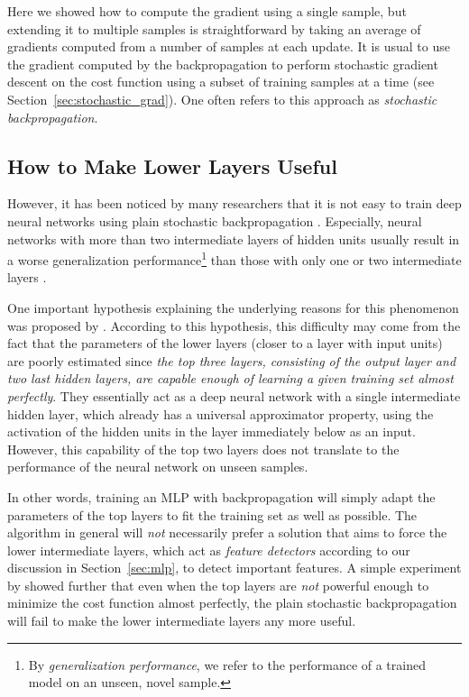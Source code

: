 \documentclass[dissertation,nocontribution,draft*]{aaltoseries}
\begin{document}
Here we showed how to compute the gradient using a single
sample, but extending it to multiple samples is
straightforward by taking an average of
gradients computed from a number of samples at each update. It is usual to
use the gradient computed by the backpropagation to perform
stochastic gradient descent on the cost function using a
subset of training samples at a time (see
Section~\ref{sec:stochastic_grad}). One often refers to this
approach as \textit{stochastic backpropagation}.

\subsection{How to Make Lower Layers Useful}
\label{sec:bp_imp}

However, it has been noticed by many researchers that it is not easy to
train deep neural networks using plain stochastic
backpropagation \citep[see, e.g.,][]{Bengio2007a}.
Especially, neural networks with more than two intermediate
layers of hidden units usually result in a worse
generalization performance\footnote{By
\textit{generalization performance}, we refer to the
performance of a trained model on an unseen, novel sample.
} than those with only one or two intermediate layers
\citep{Bengio2007nips}.

One important hypothesis explaining the underlying
reasons for this phenomenon was proposed by
\citet{Bengio2007nips}. According to this hypothesis, this
difficulty may come from the fact that the parameters of the
lower layers (closer to a layer with input units) are poorly
estimated since \textit{the top three layers, consisting of
the output layer and two last hidden layers, are capable
enough of learning a given training set almost perfectly}.
They essentially act as a deep neural network with a single
intermediate hidden layer, which already has a universal
approximator property, using the activation of the hidden
units in the layer immediately below as an input. However,
this capability of the top two layers does not translate to
the performance of the neural network on unseen samples.

In other words, training an MLP with backpropagation will
simply adapt the parameters of the top layers to fit the
training set as well as possible. The algorithm in general
will \textit{not} necessarily prefer a solution that aims to
force the lower intermediate layers, which act as
\textit{feature detectors} according to our discussion in
Section~\ref{sec:mlp}, to detect important features.  A
simple experiment by \citet{Bengio2007nips} showed further
that even when the top layers are \textit{not} powerful
enough to minimize the cost function almost perfectly, the
plain stochastic backpropagation will fail to make the lower
intermediate layers any more useful.
\end{document}
